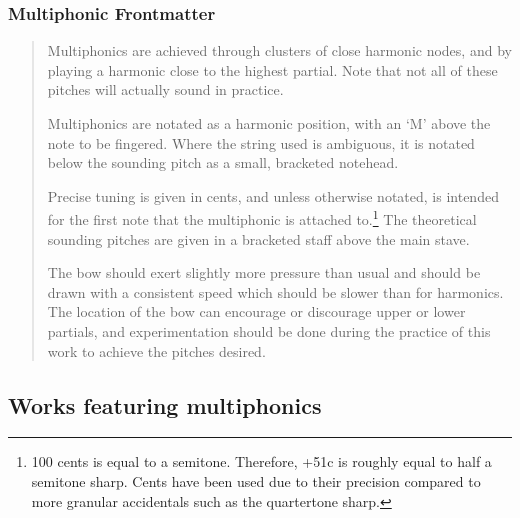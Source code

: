 \subsubsection{Multiphonic Frontmatter}\label{sec:multiphonicFrontmatter}
\begin{quotation}
  
  Multiphonics are achieved through clusters of close harmonic nodes, and by playing a harmonic close to the highest partial.
  Note that not all of these pitches will actually sound in practice.
  
  Multiphonics are notated as a harmonic position, with an `M' above the note to be fingered.
  Where the string used is ambiguous, it is notated below the sounding pitch as a small, bracketed notehead.

  Precise tuning is given in cents, and unless otherwise notated, is intended for the first note that the multiphonic is attached to.\footnote{100 cents is equal to a semitone. Therefore, +51c is roughly equal to half a semitone sharp. Cents have been used due to their precision compared to more granular accidentals such as the quartertone sharp.}
  The theoretical sounding pitches are given in a bracketed staff above the main stave.

  The bow should exert slightly more pressure than usual and should be drawn with a consistent speed which should be slower than for harmonics.
  The location of the bow can encourage or discourage upper or lower partials, and experimentation should be done during the practice of this work to achieve the pitches desired.
\end{quotation}


\subsection{Works featuring multiphonics}\label{sec:multiphonicsLiterature}

